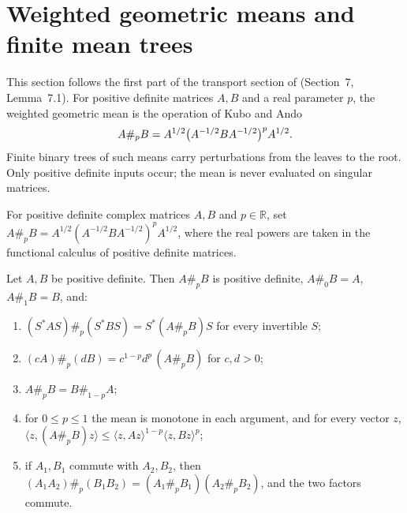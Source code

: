 \section{Weighted geometric means and finite mean trees}\label{sec:matrix_mean_trees}

This section follows the first part of the transport section of
\cite{OpenAI2026AreaLaw} (Section~7, Lemma~7.1). For positive definite
matrices $A,B$ and a real parameter $p$, the weighted geometric mean is the
operation of Kubo and Ando~\cite{KuboAndo1980Means}
\begin{align}
    A\#_p B = A^{1/2}\bigl(A^{-1/2}BA^{-1/2}\bigr)^p A^{1/2}.
    \notag
\end{align}
Finite binary trees of such means carry perturbations from the leaves to the
root. Only positive definite inputs occur; the mean is never evaluated on
singular matrices.

\begin{definition}\label{def:weighted_geometric_mean}
    \leanok
    For positive definite complex matrices $A,B$ and $p\in\mathbb R$, set
    $A\#_pB=A^{1/2}(A^{-1/2}BA^{-1/2})^pA^{1/2}$, where the real powers are
    taken in the functional calculus of positive definite matrices.
\end{definition}

\begin{lemma}\label{lem:weighted_geometric_mean_vertex}
    \leanok
    Let $A,B$ be positive definite. Then $A\#_pB$ is positive definite,
    $A\#_0B=A$, $A\#_1B=B$, and:
    \begin{enumerate}
        \item $(S^*AS)\#_p(S^*BS)=S^*(A\#_pB)S$ for every invertible $S$;
        \item $(cA)\#_p(dB)=c^{1-p}d^p\,(A\#_pB)$ for $c,d>0$;
        \item $A\#_pB=B\#_{1-p}A$;
        \item for $0\le p\le1$ the mean is monotone in each argument, and for
        every vector $z$,
        $\langle z,(A\#_pB)z\rangle\le\langle z,Az\rangle^{1-p}\langle z,Bz\rangle^p$;
        \item if $A_1,B_1$ commute with $A_2,B_2$, then
        $(A_1A_2)\#_p(B_1B_2)=(A_1\#_pB_1)(A_2\#_pB_2)$, and the two factors
        commute.
    \end{enumerate}
\end{lemma}

